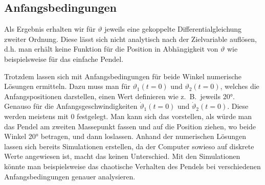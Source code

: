 \subsection{Anfangsbedingungen}
Als Ergebnis erhalten wir für \(\vartheta\) jeweils eine gekoppelte Differentialgleichung zweiter Ordnung.
Diese lässt sich nicht analytisch nach der Zielvariable auflösen,
d.h. man erhält keine Funktion für die Position in Abhängigkeit von \(\vartheta\) 
wie beispielsweise für das einfache Pendel.

Trotzdem lassen sich mit Anfangsbedingungen für beide Winkel numerische Lösungen ermitteln.
Dazu muss man für \(\vartheta_1(t=0)\) und \(\vartheta_2(t=0)\), welches die Anfangspositionen darstellen,
einen Wert definieren wie z.~B.~jeweils 20°. Genauso für die Anfangsgeschwindigkeiten \(\dot{\vartheta}_1(t=0)\)
und \(\dot{\vartheta}_2(t=0)\).
Diese werden meistens mit 0 festgelegt. Man kann sich das vorstellen, als würde man das Pendel
am zweiten Massepunkt fassen und auf die Position ziehen, wo beide Winkel 20° betragen, und dann loslassen.
Anhand der numerischen Lösungen lassen sich bereits Simulationen erstellen, da der Computer
sowieso auf diskrete Werte angewiesen ist, macht das keinen Unterschied.
Mit den Simulationen könnte man beispielsweise das chaotische Verhalten des Pendels bei verschiedenen 
Anfangsbedingungen genauer analysieren.

